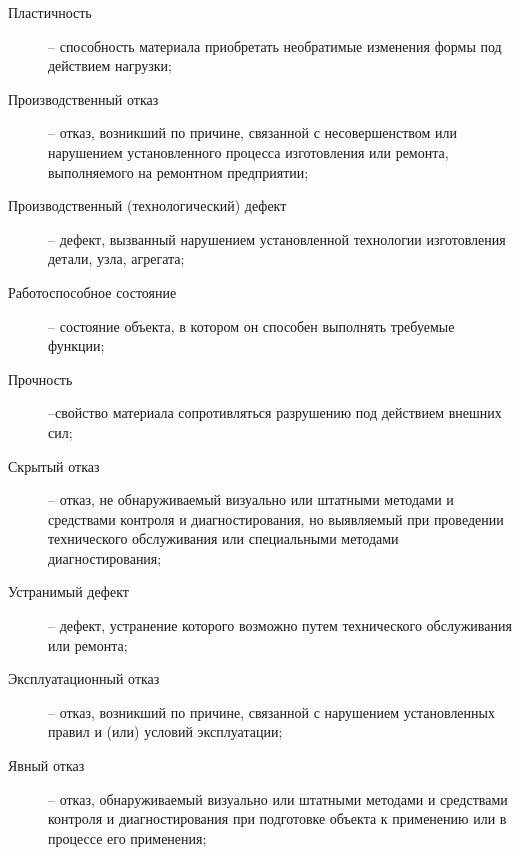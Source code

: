 \begin{description}
\item
[Пластичность] --  способность  материала
приобретать  необратимые  изменения  формы  под действием нагрузки;
\item
[Производственный отказ] -- отказ, возникший по причине, связанной с несовершенством или нарушением установленного процесса изготовления или ремонта, выполняемого на ремонтном предприятии;
\item
[Производственный (технологический) дефект] -- дефект, вызванный нарушением установленной технологии изготовления детали, узла, агрегата;
\item
[Работоспособное состояние] -- состояние объекта, в котором он способен выполнять требуемые функции;
\item
[Прочность] --свойство материала сопротивляться разрушению под действием внешних сил;
\item
[Скрытый отказ] -- отказ, не обнаруживаемый визуально или штатными методами и средствами контроля и диагностирования, но выявляемый при проведении технического обслуживания или специальными методами диагностирования;
\item
[Устранимый дефект] -- дефект, устранение которого возможно путем технического  обслуживания или ремонта;
\item
[Эксплуатационный отказ] -- отказ, возникший по причине, связанной с нарушением установленных правил и (или) условий эксплуатации;
\item
[Явный отказ] -- отказ, обнаруживаемый визуально или штатными методами и средствами контроля и диагностирования при подготовке объекта к применению или в процессе его применения;
\end{description}

